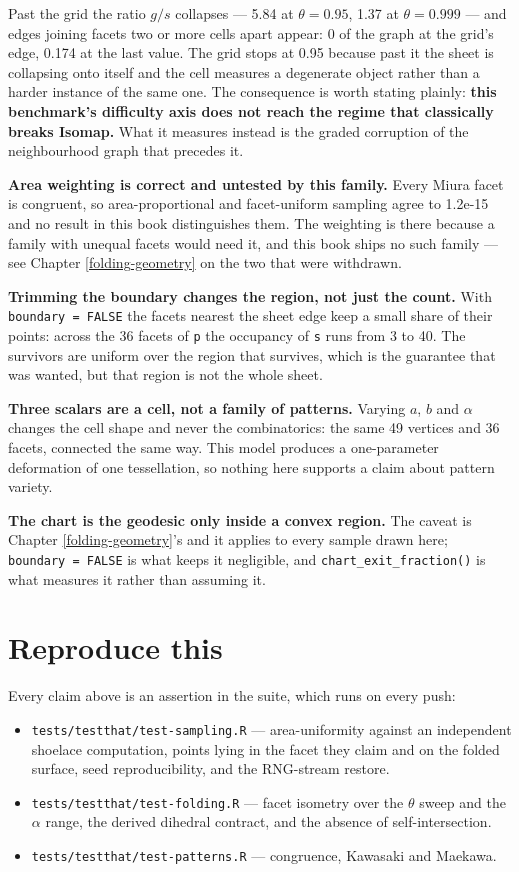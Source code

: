 \documentclass[
  british,
  a4paper,
]{book}
\providecommand{\tightlist}{%
  \setlength{\itemsep}{0pt}\setlength{\parskip}{0pt}}
\begin{document}
Past the grid the ratio \(g/s\) collapses --- 5.84 at
\(\theta = 0.95\), 1.37 at
\(\theta = 0.999\) --- and edges joining facets two or more cells
apart appear: 0 of the graph at the grid's edge,
0.174 at the last value. The grid stops at
0.95 because past it the sheet is collapsing onto itself and the cell measures a degenerate object rather than
a harder instance of the same one. The consequence is worth stating plainly:
\textbf{this benchmark's difficulty axis does not reach the regime that classically
breaks Isomap.} What it measures instead is the graded corruption of the
neighbourhood graph that precedes it.

\textbf{Area weighting is correct and untested by this family.} Every Miura facet is
congruent, so area-proportional and facet-uniform sampling agree to
1.2e-15 and no result in this
book distinguishes them. The weighting is there because a family with unequal facets would need it, and this
book ships no such family --- see Chapter \ref{folding-geometry} on the two that
were withdrawn.

\textbf{Trimming the boundary changes the region, not just the count.} With
\texttt{boundary\ =\ FALSE} the facets nearest the sheet edge keep a small share of their
points: across the 36 facets of \texttt{p} the occupancy of \texttt{s} runs
from 3 to
40. The survivors are uniform
over the region that survives, which is the guarantee that was wanted, but that
region is not the whole sheet.

\textbf{Three scalars are a cell, not a family of patterns.} Varying \(a\), \(b\) and
\(\alpha\) changes the cell shape and never the combinatorics: the same
49 vertices and 36 facets, connected the
same way. This model produces a one-parameter deformation of one tessellation,
so nothing here supports a claim about pattern variety.

\textbf{The chart is the geodesic only inside a convex region.} The caveat is
Chapter \ref{folding-geometry}'s and it applies to every sample drawn here;
\texttt{boundary\ =\ FALSE} is what keeps it negligible, and \texttt{chart\_exit\_fraction()} is
what measures it rather than assuming it.

\section{Reproduce this}\label{gen-reproduce}

Every claim above is an assertion in the suite, which runs on every push:

\begin{itemize}
\tightlist
\item
  \texttt{tests/testthat/test-sampling.R} --- area-uniformity against an independent
  shoelace computation, points lying in the facet they claim and on the folded
  surface, seed reproducibility, and the RNG-stream restore.
\item
  \texttt{tests/testthat/test-folding.R} --- facet isometry over the \(\theta\) sweep and
  the \(\alpha\) range, the derived dihedral contract, and the absence of
  self-intersection.
\item
  \texttt{tests/testthat/test-patterns.R} --- congruence, Kawasaki and Maekawa.
\end{itemize}
\end{document}
